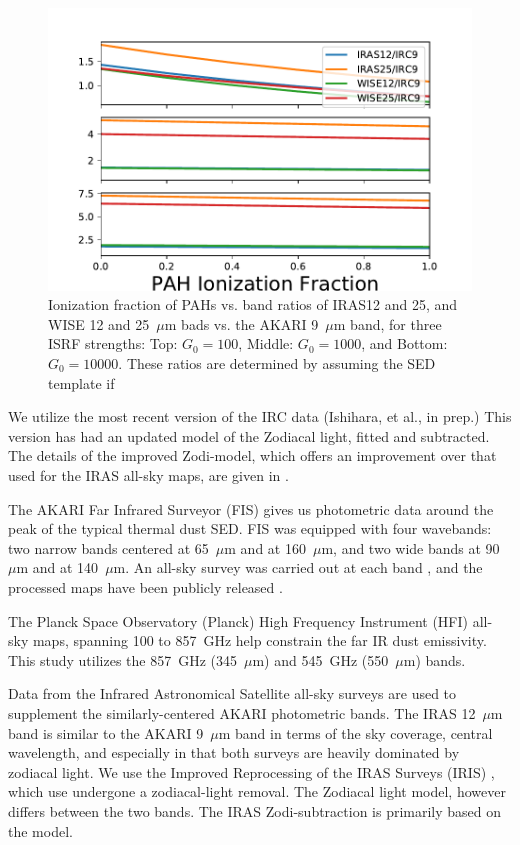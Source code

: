        \begin{figure}
       \label{fig:inband_ionfrac_ratios}
       \centering
       \includegraphics[width=150mm]{../Plots/band-ratio-multiple.pdf}
       \caption{Ionization fraction of PAHs vs. band ratios of IRAS12 and 25, and WISE 12 and 25~$\mu$m bads vs. the AKARI 9~$\mu$m band, for three ISRF strengths: Top: $G_{0} = 100$, Middle: $G_{0} = 1000$, and Bottom: $G_{0} = 10000$. These ratios are determined by assuming the SED template if \cite{dustem11} }
       \end{figure}

        We utilize the most recent version of the IRC data (Ishihara, et al., in prep.) This version has had an updated model of the Zodiacal light, fitted and subtracted. The details of the improved Zodi-model, which offers an improvement over that used for the IRAS all-sky maps, are given in \cite{kondo16}.



      The AKARI Far Infrared Surveyor (FIS) gives us photometric data around the peak of the typical thermal dust SED. FIS was equipped with four wavebands: two narrow bands centered at 65~$\mu$m and at 160~$\mu$m, and two wide bands at 90~$\mu$m and at 140~$\mu$m. An all-sky survey was carried out at each band \citep{kawada07}, and the processed maps have been publicly released \citep{doi15}.

       The Planck Space Observatory (Planck) High Frequency Instrument (HFI) all-sky maps, spanning 100 to 857~GHz \citep{hfi14viii} help constrain the far IR dust emissivity. This study utilizes the 857~GHz (345~$\mu$m) and 545~GHz (550~$\mu$m) bands.

       Data from the Infrared Astronomical Satellite \citep{iras84} all-sky surveys are used to supplement the similarly-centered AKARI photometric bands. The IRAS 12~$\mu$m band is similar to the AKARI 9~$\mu$m band in terms of the sky coverage, central wavelength, and especially in that both surveys are heavily dominated by zodiacal light. We use the Improved Reprocessing of the IRAS Surveys (IRIS) \citep{iris05}, which use undergone a zodiacal-light removal. The Zodiacal light model, however differs between the two bands. The IRAS Zodi-subtraction is primarily based on the \cite{kelsall98} model.

